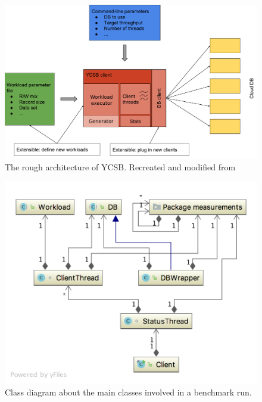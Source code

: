 \begin{figure}
  \centering
  \includegraphics[width=\textwidth]{images/ycsbArchitecture}
  \caption{The rough architecture of YCSB. Recreated and modified from~\cite[25]{Abubakar2014}}
  \label{fig:ycsbArchitecture}
\end{figure}

\begin{figure}
  \centering
  \includegraphics[width=\textwidth]{images/basicYCSBWorkflow}
  \caption{Class diagram about the main classes involved in a benchmark run.}
  \label{fig:basicYCSBWorkflow}
\end{figure}
